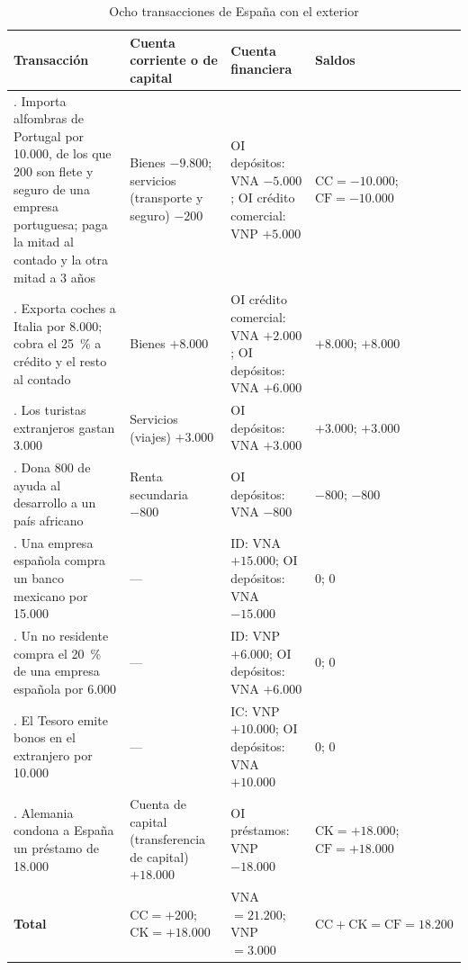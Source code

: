 \documentclass[11pt]{article}
\begin{document}
\begin{table}[H]
\centering
\caption{Ocho transacciones de España con el exterior}\label{tab:asientos}
\scriptsize
\begin{tabular}{>{\raggedright\arraybackslash}m{4.9cm}>{\raggedright\arraybackslash}m{3.2cm}>{\raggedright\arraybackslash}m{3.6cm}>{\raggedright\arraybackslash}m{2.8cm}}
\toprule
\rowcolor{tceeazulpalido}
\textbf{Transacción} & \textbf{Cuenta corriente o de capital} & \textbf{Cuenta financiera} & \textbf{Saldos} \\
\midrule
1. Importa alfombras de Portugal por 10.000, de los que 200 son flete y seguro de una empresa portuguesa; paga la mitad al contado y la otra mitad a 3 años & Bienes $-9.800$; servicios (transporte y seguro) $-200$ & OI depósitos: VNA $-5.000$; OI crédito comercial: VNP $+5.000$ & $\mathrm{CC}=-10.000$; $\mathrm{CF}=-10.000$ \\
2. Exporta coches a Italia por 8.000; cobra el 25~\% a crédito y el resto al contado & Bienes $+8.000$ & OI crédito comercial: VNA $+2.000$; OI depósitos: VNA $+6.000$ & $+8.000$; $+8.000$ \\
3. Los turistas extranjeros gastan 3.000 & Servicios (viajes) $+3.000$ & OI depósitos: VNA $+3.000$ & $+3.000$; $+3.000$ \\
4. Dona 800 de ayuda al desarrollo a un país africano & Renta secundaria $-800$ & OI depósitos: VNA $-800$ & $-800$; $-800$ \\
5. Una empresa española compra un banco mexicano por 15.000 & --- & ID: VNA $+15.000$; OI depósitos: VNA $-15.000$ & $0$; $0$ \\
6. Un no residente compra el 20~\% de una empresa española por 6.000 & --- & ID: VNP $+6.000$; OI depósitos: VNA $+6.000$ & $0$; $0$ \\
7. El Tesoro emite bonos en el extranjero por 10.000 & --- & IC: VNP $+10.000$; OI depósitos: VNA $+10.000$ & $0$; $0$ \\
8. Alemania condona a España un préstamo de 18.000 & Cuenta de capital (transferencia de capital) $+18.000$ & OI préstamos: VNP $-18.000$ & $\mathrm{CK}=+18.000$; $\mathrm{CF}=+18.000$ \\
\midrule
\textbf{Total} & $\mathrm{CC}=+200$; $\mathrm{CK}=+18.000$ & VNA $=21.200$; VNP $=3.000$ & $\mathrm{CC}+\mathrm{CK}=\mathrm{CF}=18.200$ \\
\bottomrule
\end{tabular}
\end{table}
\end{document}
